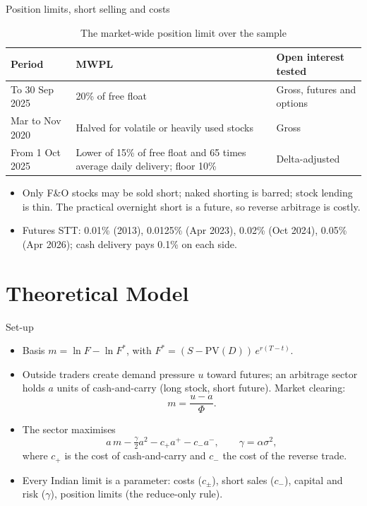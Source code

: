 \documentclass[11pt]{beamer}
\begin{document}
\begin{frame}{Position limits, short selling and costs}
  \begin{table}
    \scriptsize
    \caption{The market-wide position limit over the sample}
    \begin{tabular}{@{}p{2.4cm}p{4.6cm}p{3.2cm}@{}}
      \toprule
      Period & MWPL & Open interest tested \\
      \midrule
      To 30 Sep 2025 & 20\% of free float & Gross, futures and options \\
      Mar to Nov 2020 & Halved for volatile or heavily used stocks & Gross \\
      From 1 Oct 2025 & Lower of 15\% of free float and 65 times average daily delivery; floor 10\% & Delta-adjusted \\
      \bottomrule
    \end{tabular}
  \end{table}
  \begin{itemize}
    \small
    \item Only F\&O stocks may be sold short; naked shorting is barred; stock lending is thin. The practical overnight
    short is a future, so reverse arbitrage is costly.
    \item Futures STT: 0.01\% (2013), 0.0125\% (Apr 2023), 0.02\% (Oct 2024), 0.05\% (Apr 2026); cash delivery pays
    0.1\% on each side.
  \end{itemize}
\end{frame}

\section{Theoretical Model}

\begin{frame}{Set-up}
  \begin{itemize}
    \item Basis $m=\ln F-\ln F^*$, with $F^*=(S-\mathrm{PV}(D))\,e^{r(T-t)}$.
    \item Outside traders create demand pressure $u$ toward futures; an arbitrage sector holds $a$ units of
    cash-and-carry (long stock, short future). Market clearing:
    \[ m=\frac{u-a}{\Phi}. \]
    \item The sector maximises
    \[ a\,m-\tfrac{\gamma}{2}a^2-c_+a^+-c_-a^-,\qquad \gamma=\alpha\sigma^2, \]
    where $c_+$ is the cost of cash-and-carry and $c_-$ the cost of the reverse trade.
    \item Every Indian limit is a parameter: costs ($c_\pm$), short sales ($c_-$), capital and risk ($\gamma$),
    position limits (the reduce-only rule).
  \end{itemize}
\end{frame}
\end{document}
